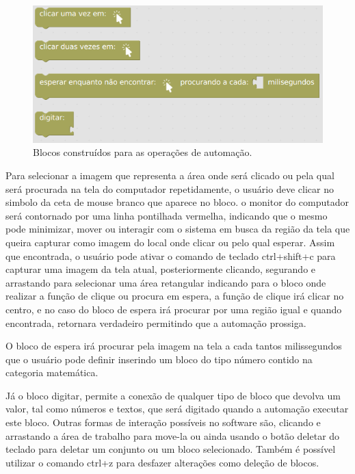 \documentclass[tg]{mdtufsm}
\begin{document}
                \begin{figure}[!htb]
                    {\centering
                    \includegraphics[width=1.0\textwidth]{imagens/blocks.png}
                    \caption{Blocos construídos para as operações de automação.}
                    \label{fig:myblocks}}
                \end{figure}

                Para selecionar a imagem que representa a área onde será clicado ou pela qual será procurada na tela do computador repetidamente, o usuário deve clicar no simbolo da ceta de mouse branco que aparece no bloco. o monitor do computador será contornado por uma linha pontilhada vermelha, indicando que o mesmo pode minimizar, mover ou interagir com o sistema em busca da região da tela que queira capturar como imagem do local onde clicar ou pelo qual esperar. Assim que encontrada, o usuário pode ativar o comando de teclado ctrl+shift+c para capturar uma imagem da tela atual, posteriormente clicando, segurando e arrastando para selecionar uma área retangular indicando para o bloco onde realizar a função de clique ou procura em espera, a função de clique irá clicar no centro, e no caso do bloco de espera irá procurar por uma região igual e quando encontrada, retornara verdadeiro permitindo que a automação prossiga.

                O bloco de espera irá procurar pela imagem na tela a cada tantos milissegundos que o usuário pode definir inserindo um bloco do tipo número contido na categoria matemática.

                Já o bloco digitar, permite a conexão de qualquer tipo de bloco que devolva um valor, tal como números e textos, que será digitado quando a automação executar este bloco.
                Outras formas de interação possíveis no software são, clicando e arrastando a área de trabalho para move-la ou ainda usando o botão deletar do teclado para deletar um conjunto ou um bloco selecionado. Também é possível utilizar o comando ctrl+z para desfazer alterações como deleção de blocos.
\end{document}
